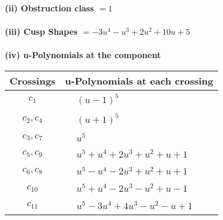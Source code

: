 \documentclass[1p]{elsarticle_modified}
\theoremstyle{definition}
\begin{document}
\flushleft \textbf{(ii) Obstruction class $= 1$}\\~\\
\flushleft \textbf{(iii) Cusp Shapes $= -3 u^4- u^3+2 u^2+10 u+5$}\\~\\
\newpage\renewcommand{\arraystretch}{1}
\flushleft \textbf{(iv) u-Polynomials at the component}\newline \\
\begin{tabular}{m{50pt}|m{274pt}}
Crossings & \hspace{64pt}u-Polynomials at each crossing \\
\hline $$\begin{aligned}c_{1}\end{aligned}$$&$\begin{aligned}
&(u-1)^5
\end{aligned}$\\
\hline $$\begin{aligned}c_{2},c_{4}\end{aligned}$$&$\begin{aligned}
&(u+1)^5
\end{aligned}$\\
\hline $$\begin{aligned}c_{3},c_{7}\end{aligned}$$&$\begin{aligned}
&u^5
\end{aligned}$\\
\hline $$\begin{aligned}c_{5},c_{9}\end{aligned}$$&$\begin{aligned}
&u^5+u^4+2 u^3+u^2+u+1
\end{aligned}$\\
\hline $$\begin{aligned}c_{6},c_{8}\end{aligned}$$&$\begin{aligned}
&u^5- u^4-2 u^3+u^2+u+1
\end{aligned}$\\
\hline $$\begin{aligned}c_{10}\end{aligned}$$&$\begin{aligned}
&u^5+u^4-2 u^3- u^2+u-1
\end{aligned}$\\
\hline $$\begin{aligned}c_{11}\end{aligned}$$&$\begin{aligned}
&u^5-3 u^4+4 u^3- u^2- u+1
\end{aligned}$\\
\hline
\end{tabular}\\~\\
\end{document}
